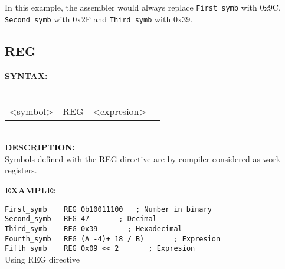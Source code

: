             In this example, the assembler would always replace {\color{highlight_symbol}\verb'First_symb'} with 0x9C,
            {\color{highlight_symbol}\verb'Second_symb'} with 0x2F and {\color{highlight_symbol}\verb'Third_symb'} with 0x39.

                \subsection{REG}
                \textbf{SYNTAX:}\\
                                \\ {
                                        \texttt{}
                                        \begin{tabular}[h!]{llll}
                                        { \color{highlight_symbol} <symbol> }  &
                                        { \color{highlight_directive} REG } &
                                        { \color{highlight_constant} <expresion> } & { \color{highlight_comment} }\\
                                        \end{tabular}
                                }
                                \\

                \textbf{DESCRIPTION:}\\
                Symbols defined with the REG directive are by compiler considered as work registers.

                \textbf{EXAMPLE:}\\
                       \begin{code}[h!]
                \mysmallfont{}
                            {\color{highlight_constant}\verb'First_symb'}\verb'    '{\color{highlight_directive}\verb'REG'}\verb' '{\color{highlight_bin}\verb'0b10011100'}\verb'   '{\color{highlight_comment}\verb'; Number in binary'}\\
                            {\color{highlight_constant}\verb'Second_symb'}\verb'   '{\color{highlight_directive}\verb'REG'}\verb' '{\color{highlight_oct}\verb'47'}\verb'       '{\color{highlight_comment}\verb'; Decimal'}\\
                            {\color{highlight_constant}\verb'Third_symb'}\verb'    '{\color{highlight_directive}\verb'REG'}\verb' '{\color{highlight_dec}\verb'0x39'}\verb'       '{\color{highlight_comment}\verb'; Hexadecimal'}\\
                            {\color{highlight_constant}\verb'Fourth_symb'}\verb'   '{\color{highlight_directive}\verb'REG'}\verb' '{\color{highlight_dec}\verb'(A -4)+ 18 / B)'}\verb'       '{\color{highlight_comment}\verb'; Expresion'}\\
                            {\color{highlight_constant}\verb'Fifth_symb'}\verb'    '{\color{highlight_directive}\verb'REG'}\verb' '{\color{highlight_dec}\verb'0x09 << 2'}\verb'       '{\color{highlight_comment}\verb'; Expresion'}\\
              \caption{Using REG directive}
                \end{code}

